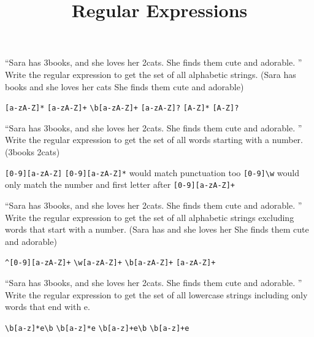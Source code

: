 \documentclass[theme=sleek, randomorder, hidesidemenu]{webquiz}
\title{Regular Expressions}
\begin{document}
\begin{question}
  ``Sara has 3books, and she loves her 2cats. She finds them cute and adorable. ''\\
  Write the regular expression to get the set of all alphabetic strings.
  (Sara has books and she loves her cats She finds them cute and adorable)
  \begin{choice}[columns=2]
    \incorrect \verb|[a-zA-Z]*|
    \correct \verb|[a-zA-Z]+|
    \incorrect \verb|\b[a-zA-Z]+|
    \incorrect \verb|[a-zA-Z]?|
    \incorrect \verb|[A-Z]*|
    \incorrect \verb|[A-Z]?|
  \end{choice}
\end{question}

\begin{question}
  ``Sara has 3books, and she loves her 2cats. She finds them cute and adorable. ''\\
  Write the regular expression to get the set of all words starting with a number.
  (3books 2cats)
  \begin{choice}[columns=2]
    \incorrect \verb|[0-9][a-zA-Z]|
    \incorrect \verb|[0-9][a-zA-Z]*| \feedback would match punctuation too
    \incorrect \verb|[0-9]\w| \feedback would only match the number and first letter after
    \correct \verb|[0-9][a-zA-Z]+|
  \end{choice}
\end{question}

\begin{question}
  ``Sara has 3books, and she loves her 2cats. She finds them cute and adorable. ''\\
  Write the regular expression to get the set of all alphabetic strings excluding words that start with a number.
  (Sara has and she loves her She finds them cute and adorable)
  \begin{choice}[columns=2]
    \incorrect \verb|^[0-9][a-zA-Z]+|
    \incorrect \verb|\w[a-zA-Z]+|
    \correct \verb|\b[a-zA-Z]+|
    \incorrect \verb|[a-zA-Z]+|
  \end{choice}
\end{question}

\begin{question}
  ``Sara has 3books, and she loves her 2cats. She finds them cute and adorable. ''\\
  Write the regular expression to get the set of all lowercase strings including only words that end with e.
  \begin{choice}[columns=2]
    \incorrect \verb|\b[a-z]*e\b|
    \incorrect \verb|\b[a-z]*e|
    \correct \verb|\b[a-z]+e\b|
    \incorrect \verb|\b[a-z]+e|
  \end{choice}
\end{question}
\end{document}

